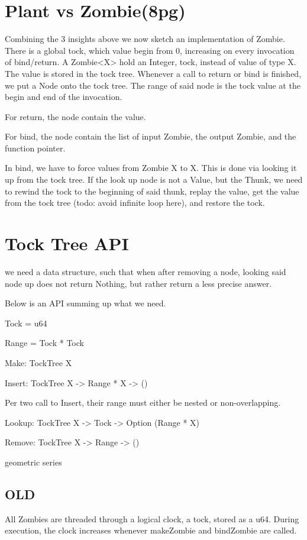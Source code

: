 \section{Plant vs Zombie(8pg)}
Combining the 3 insights above we now sketch an implementation of Zombie.
There is a global tock, which value begin from 0, increasing on every invocation of bind/return.
A Zombie<X> hold an Integer, tock, instead of value of type X.
The value is stored in the tock tree.
Whenever a call to return or bind is finished, we put a Node onto the tock tree.
The range of said node is the tock value at the begin and end of the invocation.

For return, the node contain the value.

For bind, the node contain the list of input Zombie, the output Zombie, and the function pointer.

In bind, we have to force values from Zombie X to X. This is done via looking it up from the tock tree. If the look up node is not a Value, but the Thunk, we need to rewind the tock to the beginning of said thunk, replay the value, get the value from the tock tree (todo: avoid infinite loop here), and restore the tock.

\section{Tock Tree API}
we need a data structure, such that when after removing a node, looking said node up does not return Nothing, but rather return a less precise answer.

Below is an API summing up what we need.

Tock = u64

Range = Tock * Tock

Make: TockTree X

Insert: TockTree X -> Range * X -> ()

Per two call to Insert, their range must either be nested or non-overlapping.

Lookup: TockTree X -> Tock -> Option (Range * X)

Remove: TockTree X -> Range -> ()

geometric series
\subsection{OLD}
All Zombies are threaded through a logical clock, a tock, stored as a u64.
During execution, the clock increases whenever makeZombie and bindZombie are called.

